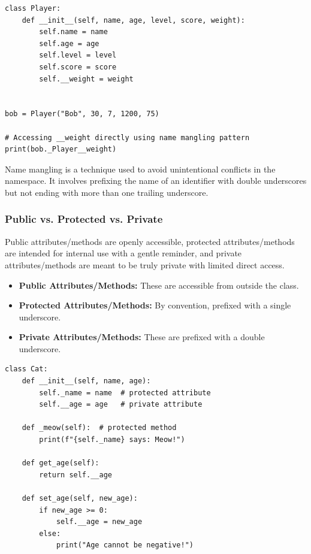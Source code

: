 \begin{codebox}
\begin{verbatim}
class Player:
    def __init__(self, name, age, level, score, weight):
        self.name = name
        self.age = age
        self.level = level
        self.score = score
        self.__weight = weight


bob = Player("Bob", 30, 7, 1200, 75)

# Accessing __weight directly using name mangling pattern
print(bob._Player__weight)
\end{verbatim}
\end{codebox}

Name mangling is a technique used to avoid unintentional conflicts in the namespace. It involves prefixing the name of an identifier with double underscores but not ending with more than one trailing underscore.

\subsubsection{Public vs. Protected vs. Private}
Public attributes/methods are openly accessible, protected attributes/methods are intended for internal use with a gentle reminder, and private attributes/methods are meant to be truly private with limited direct access.
\begin{itemize}
    \item \textbf{Public Attributes/Methods:} These are accessible from outside the class.
    \item \textbf{Protected Attributes/Methods:} By convention, prefixed with a single underscore.
    \item \textbf{Private Attributes/Methods:} These are prefixed with a double underscore.
\end{itemize}

\begin{codebox}
\begin{verbatim}
class Cat:
    def __init__(self, name, age):
        self._name = name  # protected attribute
        self.__age = age   # private attribute

    def _meow(self):  # protected method
        print(f"{self._name} says: Meow!")

    def get_age(self):
        return self.__age

    def set_age(self, new_age):
        if new_age >= 0:
            self.__age = new_age
        else:
            print("Age cannot be negative!")
\end{verbatim}
\end{codebox}


